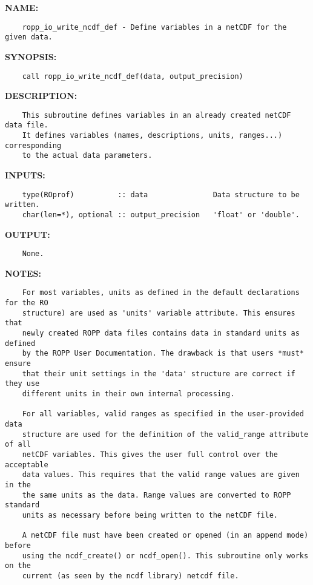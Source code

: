 \label{ch:robo121}
\label{ch:Writing_ropp_io_write_ncdf_def}
\textbf{NAME:}\hspace{0.08in}\begin{Verbatim}
    ropp_io_write_ncdf_def - Define variables in a netCDF for the given data.
\end{Verbatim}
\textbf{SYNOPSIS:}\hspace{0.08in}\begin{Verbatim}
    call ropp_io_write_ncdf_def(data, output_precision)
\end{Verbatim}
\textbf{DESCRIPTION:}\hspace{0.08in}\begin{Verbatim}
    This subroutine defines variables in an already created netCDF data file.
    It defines variables (names, descriptions, units, ranges...) corresponding
    to the actual data parameters.
\end{Verbatim}
\textbf{INPUTS:}\hspace{0.08in}\begin{Verbatim}
    type(ROprof)          :: data               Data structure to be written.
    char(len=*), optional :: output_precision   'float' or 'double'.
\end{Verbatim}
\textbf{OUTPUT:}\hspace{0.08in}\begin{Verbatim}
    None.
\end{Verbatim}
\textbf{NOTES:}\hspace{0.08in}\begin{Verbatim}
    For most variables, units as defined in the default declarations for the RO
    structure) are used as 'units' variable attribute. This ensures that
    newly created ROPP data files contains data in standard units as defined
    by the ROPP User Documentation. The drawback is that users *must* ensure
    that their unit settings in the 'data' structure are correct if they use
    different units in their own internal processing.

    For all variables, valid ranges as specified in the user-provided data
    structure are used for the definition of the valid_range attribute of all
    netCDF variables. This gives the user full control over the acceptable
    data values. This requires that the valid range values are given in the
    the same units as the data. Range values are converted to ROPP standard
    units as necessary before being written to the netCDF file.

    A netCDF file must have been created or opened (in an append mode) before
    using the ncdf_create() or ncdf_open(). This subroutine only works on the
    current (as seen by the ncdf library) netcdf file.
\end{Verbatim}
